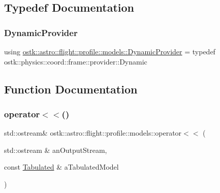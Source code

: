 \subsection{Typedef Documentation}
\mbox{\label{namespaceostk_1_1astro_1_1flight_1_1profile_1_1models_a7e9732cb31adb5d5c1f85f7bad1f3424}} 
\subsubsection{\texorpdfstring{Dynamic\+Provider}{DynamicProvider}}
{\footnotesize\ttfamily using \hyperlink{namespaceostk_1_1astro_1_1flight_1_1profile_1_1models_a7e9732cb31adb5d5c1f85f7bad1f3424}{ostk\+::astro\+::flight\+::profile\+::models\+::\+Dynamic\+Provider} = typedef ostk\+::physics\+::coord\+::frame\+::provider\+::\+Dynamic}



\subsection{Function Documentation}
\mbox{\label{namespaceostk_1_1astro_1_1flight_1_1profile_1_1models_a612062c86632f2ac50ed8417a18dc921}} 
\subsubsection{\texorpdfstring{operator$<$$<$()}{operator<<()}}
{\footnotesize\ttfamily std\+::ostream\& ostk\+::astro\+::flight\+::profile\+::models\+::operator$<$$<$ (\begin{DoxyParamCaption}\item[{std\+::ostream \&}]{an\+Output\+Stream,  }\item[{const \hyperlink{classostk_1_1astro_1_1flight_1_1profile_1_1models_1_1_tabulated}{Tabulated} \&}]{a\+Tabulated\+Model }\end{DoxyParamCaption})}

